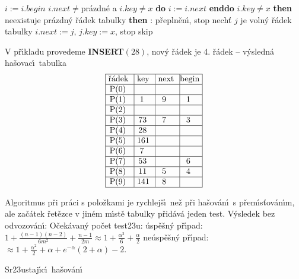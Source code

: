 \phantom{---}$i:=i.begin$
\phantom{---}{\bf while} $i.next\ne$pr\'azdn\'e a $i.key\ne x$ {\bf do} $i:=i.next$ {\bf enddo}\newline 
\phantom{---}{\bf if} $i.key\ne x$ {\bf then}\newline 
\phantom{------}{\bf if} neexistuje pr\'azdn\'y \v r\'adek tabulky {\bf then}\newline 
\phantom{---------}{\bf V\'ystup}: p\v repln\v en\'\i , stop\newline 
\phantom{------}{\bf else}\newline 
\phantom{---------}nech\v t $j$ je voln\'y \v r\'adek tabulky\newline 
\phantom{---------}$i.next:=j$, $j.key:=x$, stop\newline 
\phantom{------}{\bf endif}\newline
\phantom{---}{\bf endif\newline 
endif}
skip

\flushpar V p\v r\'\i kladu provedeme {\bf INSERT$\left(28\right)$}, nov\'y \v r\'adek je 4. 
\v r\'adek\newline 
-- v\'ysledn\'a ha\v sovac\'\i\ tabulka
$$\vtop{\offinterlineskip\halign {\strut\vrule\ # & \vrule\ # & \vrule\ # & \vrule \hfil # \hfil \vrule\cr\noalign{\hrule}\v r\'adek & key & next & begin\hfil \cr\noalign{\hrule}P(0) & & &\hfill \cr\noalign{\hrule}P(1) & 1 & 9 & 1 \cr\noalign{\hrule}P(2) & & &\hfill \cr\noalign{\hrule}P(3) & 73 & 7 & 3 \cr\noalign{\hrule}P(4) & 28 &  &\hfill \cr\noalign{\hrule}P(5) & 161 & & \hfill \cr\noalign{\hrule}P(6) & 7 & &\hfill \cr\noalign{\hrule}P(7) & 53 & & 6 \cr\noalign{\hrule}P(8) & 11 & 5 & 4  \cr\noalign{\hrule}P(9) & 141 & 8 & \hfill \cr\noalign{\hrule}}}$$

\flushpar Algoritmus p\v ri pr\'aci s polo\v zkami je rychlej\v s\'\i\ ne\v z p\v ri 
ha\v sov\'an\'\i\ s p\v rem\'\i s\v tov\'an\'\i m, ale za\v c\'atek \v ret\v ezce v 
jin\'em m\'\i st\v e tabulky p\v rid\'av\'a jeden test. V\'ysledek bez 
odvozov\'an\'\i :\newline 
O\v cek\'avan\'y po\v cet test\accent23u:\newline 
\phantom{---}\'usp\v e\v sn\'y p\v r\'\i pad: $1+\frac {\left(n-1\right)\left(n-2\right)}{6m^2}+\frac {
n-1}{2m}\approx 1+\frac {\alpha^2}6+\frac {\alpha}2$\newline 
\phantom{---}ne\'usp\v e\v sn\'y p\v r\'\i pad: $\approx 1+\frac {\alpha^2}2+\alpha 
+e^{-\alpha}\left(2+\alpha \right)-2$.

\heading
Sr\accent23ustaj\'\i c\'\i\ ha\v sov\'an\'\i
\endheading

